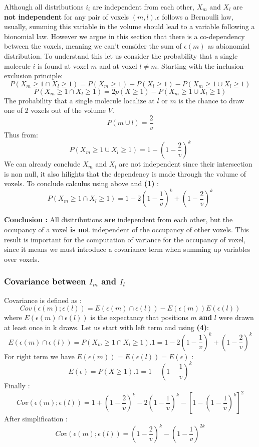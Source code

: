 \documentclass{article}
\begin{document}
Although all distributions $i_i$ are independent from each other, $X_m$ and $X_l$ are \textbf{not independent} for
any pair of voxels $(m,l)$.$\epsilon$ follows a Bernoulli law, usually, summing this variable in the volume should
lead to a variable following a bionomial law. However we argue in this section that there is a co-dependency between
the voxels, meaning we can't consider the sum of $\epsilon (m)$ as abionomial distribution. 
To understand this let us consider the probability that a single molecule $i$ is found at voxel $m$ and at voxel $l \neq m$.
Starting with the inclusion-exclusion principle:
\[
P(X_m \geq 1 \cap X_l \geq 1) = P(X_m \geq 1) + P(X_l \geq 1) - P(X_m\geq 1 \cup X_l\geq 1)
\]
\[
P(X_m \geq 1 \cap X_l \geq 1) = 2p(X \geq 1) - P(X_m\geq 1 \cup X_l\geq 1)
\]
The probability that a single molecule localize at $l$ or $m$ is the chance to draw one of 2 voxels out of the volume $V$.
\[
P(m \cup l) = \frac{2}{v}
\]
Thus from:
\[
P({X_m\geq 1 \cup X_l\geq 1}) = 1 - (1-\frac{2}{v})^{k}
\]
We can already conclude $X_m$ and $X_l$ are not independent since their intersection is non null, it also hilights that the dependency is made through
the volume of voxels. To conclude calculus using above and \textbf{(1)} :
\begin{equation}
    P(X_m \geq 1 \cap X_l \geq 1) =  1 - 2(1-\frac{1}{v})^{k} + (1-\frac{2}{v})^{k} 
\end{equation}

\textbf{Conclusion : }All disitributions \textbf{are} independent from each other, but the occupancy of a voxel \textbf{is not} independent of the
occupancy of other voxels. This result is important for the computation of variance for the occupancy of voxel, since it means we must introduce a 
covariance term when summing up variables over voxels.


\subsubsection{Covariance between $I_m$ and $I_l$}

Covariance is defined as :
\[
    Cov(\epsilon(m);\epsilon(l)) = E(\epsilon(m) \cap \epsilon(l)) - E(\epsilon(m))E(\epsilon(l))
\]
where $E(\epsilon(m) \cap \epsilon(l))$ is the expectancy that positions $m$ \textbf{and} $l$ were drawn at least once in k draws. Let us start with left term  and 
using \textbf{(4)}:
\[
    E(\epsilon(m) \cap \epsilon(l)) = P(X_m \geq 1 \cap X_l \geq 1).1 = 1 - 2(1-\frac{1}{v})^{k} + (1-\frac{2}{v})^{k}
\]
For right term we have $E(\epsilon(m)) = E(\epsilon(l)) = E(\epsilon)$ :
\[
E(\epsilon) = P(X\geq1).1 = 1-(1 - \frac{1}{v})^k
\]
Finally :
\[
    Cov(\epsilon(m);\epsilon(l)) =  1 + (1-\frac{2}{v})^{k} - 2(1-\frac{1}{v})^{k} - [1-(1 - \frac{1}{v})^k]^2
\]
After simplification :
\begin{equation}
    Cov(\epsilon(m);\epsilon(l)) = (1-\frac{2}{v})^k - (1-\frac{1}{v})^{2k}
\end{equation}
\end{document}
